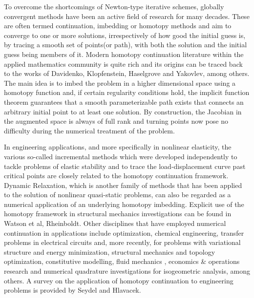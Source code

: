 To overcome the shortcomings of Newton-type iterative schemes, 
globally convergent methods have been an active field of research for many
decades\cite{Allgower:2003}. These are often termed continuation, imbedding or 
homotopy methods\cite{Rheinboldt:2000} and aim to converge to one or more 
solutions, irrespectively of how good the initial guess is, by tracing a smooth
set of points(or path), with both the solution and the initial guess being
members of it. Modern homotopy continuation literature within the applied
mathematics community is quite
rich\cite{Keller:1978,Li:1980,Chow:1978,Chow:1979,Watson:1989,Watson:1990,Allgower:1981,Rheinboldt:1980,Rheinboldt:1983,Wayburn:1987}
and its origins can be traced back to the works of
Davidenko\cite{Davidenko:1953a,Davidenko:1953},
Klopfenstein\cite{Klopfenstein:1961},
Haselgrove\cite{Haselgrove:1961} and Yakovlev\cite{Yakovlev:1964}, among others.
The main idea is to imbed the problem in a higher dimensional space using a
homotopy function and, if 
certain regularity conditions hold, the implicit function theorem guarantees that a
smooth parameterizable path exists that connects an arbitrary initial point 
to at least 
one solution. By construction, the Jacobian in the augmented space is always of
full rank and turning points now pose no difficulty during the numerical
treatment of the problem.

In engineering applications, and more specifically in nonlinear elasticity, the 
various so-called incremental methods which were developed independently to tackle 
problems 
of elastic stability and to trace the load-displacement curve past critical
points\cite{Wempner:1971,Bergan:1978,Bergan:1978b,Batoz:1979,Riks:1979,Ramm:1981,Crisfield3}
are closely related to the homotopy continuation framework\cite{Rheinboldt:1983}. 
Dynamic Relaxation,
which is another family of
methods that has been applied to the solution of nonlinear quasi-static
problems\cite{Cassell:1970,Brew:1971,Stricklin:1971,Papadrakakis:1981,Park:1982},
can also be regarded as a numerical application of an underlying homotopy
imbedding\cite{Oden:1973}. Explicit use of the homotopy framework in structural
mechanics investigations can be found in Watson et 
al\cite{Watson:1981report,Watson:1985},
Rheinboldt\cite{Rheinboldt:1981}. Other disciplines that have employed numerical
continuation in applications include
optimization\cite{Poore:1988,Watson:1989,Zhenghua:1996,Hillermeier:2001,Song:2008},
chemical engineering\cite{Byrne:1985,Lin:1987,Kovach:1987}, transfer problems
in electrical circuits\cite{Ushida:1984} and, more recently, for problems with 
variational structure and energy
minimization\cite{Hughes:2013,Mehta:2015,Mobahi:2015}, structural
mechanics\cite{Bilasse:2009,Banerjee:2013,Ligursky:2014,Sideris:2017,Groh:2018} and 
topology
optimization\cite{Chakraborty:2019}, constitutive modelling\cite{Tari:2017}, fluid 
mechanics\cite{Yu:2016,Brown:2016}
, economics \& operations
research\cite{Borkovsky:2010,Besanko:2010,Herings:2010} and numerical quadrature
investigations for isogeometric analysis\cite{Bartovn:2016,Barendrecht:2018}, among 
others. A survey on the 
application of homotopy continuation to engineering problems is provided by 
Seydel and Hlavacek\cite{Seydel:1987}.


